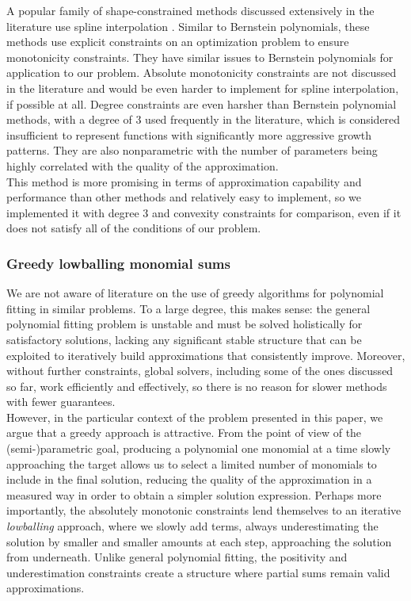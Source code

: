 \documentclass[12pt,a4paper]{article}
\begin{document}
A popular family of shape-constrained methods discussed extensively in the literature use spline interpolation \cite{2015_lu_spline_monotonic_regression, 2015_lebair_derivative_constrain_spline, 2013_nagahara_monotone_splines_linear, 2004_zhang_monotone_splines, 1998_he_monotone_spline}. Similar to Bernstein polynomials, these methods use explicit constraints on an optimization problem to ensure monotonicity constraints. They have similar issues to Bernstein polynomials for application to our problem. Absolute monotonicity constraints are not discussed in the literature and would be even harder to implement for spline interpolation, if possible at all. Degree constraints are even harsher than Bernstein polynomial methods, with a degree of 3 used frequently in the literature, which is considered insufficient to represent functions with significantly more aggressive growth patterns. They are also nonparametric with the number of parameters being highly correlated with the quality of the approximation.\\

This method is more promising in terms of approximation capability and performance than other methods and relatively easy to implement, so we implemented it with degree 3 and convexity constraints for comparison, even if it does not satisfy all of the conditions of our problem.

\subsubsection{Greedy lowballing monomial sums}
\label{greedy_lowballing}

We are not aware of literature on the use of greedy algorithms for polynomial fitting in similar problems. To a large degree, this makes sense: the general polynomial fitting problem is unstable and must be solved holistically for satisfactory solutions, lacking any significant stable structure that can be exploited to iteratively build approximations that consistently improve. Moreover, without further constraints, global solvers, including some of the ones discussed so far, work efficiently and effectively, so there is no reason for slower methods with fewer guarantees.\\

However, in the particular context of the problem presented in this paper, we argue that a greedy approach is attractive. From the point of view of the (semi-)parametric goal, producing a polynomial one monomial at a time slowly approaching the target allows us to select a limited number of monomials to include in the final solution, reducing the quality of the approximation in a measured way in order to obtain a simpler solution expression. Perhaps more importantly, the absolutely monotonic constraints lend themselves to an iterative {\emph{lowballing}} approach, where we slowly add terms, always underestimating the solution by smaller and smaller amounts at each step, approaching the solution from underneath. Unlike general polynomial fitting, the positivity and underestimation constraints create a structure where partial sums remain valid approximations.\\
\end{document}
